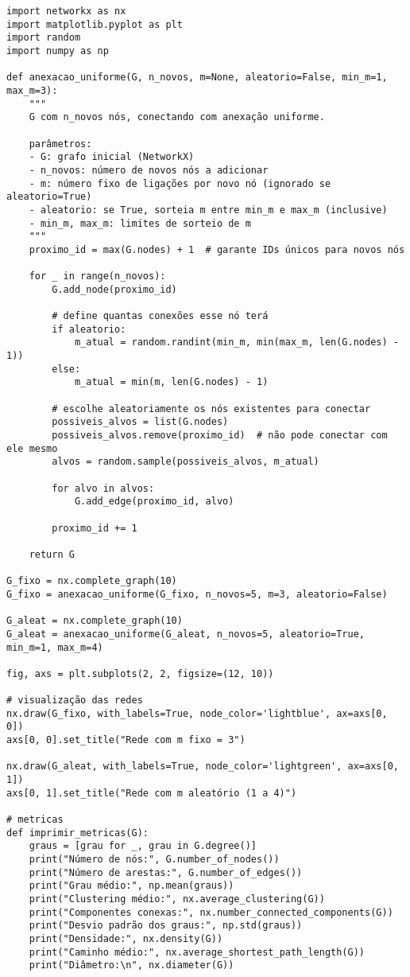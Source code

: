 \documentclass{article}
\begin{document}
\begin{verbatim}
import networkx as nx
import matplotlib.pyplot as plt
import random
import numpy as np

def anexacao_uniforme(G, n_novos, m=None, aleatorio=False, min_m=1, max_m=3):
    """
    G com n_novos nós, conectando com anexação uniforme.

    parâmetros:
    - G: grafo inicial (NetworkX)
    - n_novos: número de novos nós a adicionar
    - m: número fixo de ligações por novo nó (ignorado se aleatorio=True)
    - aleatorio: se True, sorteia m entre min_m e max_m (inclusive)
    - min_m, max_m: limites de sorteio de m
    """
    proximo_id = max(G.nodes) + 1  # garante IDs únicos para novos nós

    for _ in range(n_novos):
        G.add_node(proximo_id)

        # define quantas conexões esse nó terá
        if aleatorio:
            m_atual = random.randint(min_m, min(max_m, len(G.nodes) - 1))
        else:
            m_atual = min(m, len(G.nodes) - 1)

        # escolhe aleatoriamente os nós existentes para conectar
        possiveis_alvos = list(G.nodes)
        possiveis_alvos.remove(proximo_id)  # não pode conectar com ele mesmo
        alvos = random.sample(possiveis_alvos, m_atual)

        for alvo in alvos:
            G.add_edge(proximo_id, alvo)

        proximo_id += 1

    return G

G_fixo = nx.complete_graph(10)
G_fixo = anexacao_uniforme(G_fixo, n_novos=5, m=3, aleatorio=False)

G_aleat = nx.complete_graph(10)
G_aleat = anexacao_uniforme(G_aleat, n_novos=5, aleatorio=True, min_m=1, max_m=4)

fig, axs = plt.subplots(2, 2, figsize=(12, 10))

# visualização das redes
nx.draw(G_fixo, with_labels=True, node_color='lightblue', ax=axs[0, 0])
axs[0, 0].set_title("Rede com m fixo = 3")

nx.draw(G_aleat, with_labels=True, node_color='lightgreen', ax=axs[0, 1])
axs[0, 1].set_title("Rede com m aleatório (1 a 4)")

# metricas
def imprimir_metricas(G):
    graus = [grau for _, grau in G.degree()]
    print("Número de nós:", G.number_of_nodes())
    print("Número de arestas:", G.number_of_edges())
    print("Grau médio:", np.mean(graus))
    print("Clustering médio:", nx.average_clustering(G))
    print("Componentes conexas:", nx.number_connected_components(G))
    print("Desvio padrão dos graus:", np.std(graus))
    print("Densidade:", nx.density(G))
    print("Caminho médio:", nx.average_shortest_path_length(G))
    print("Diâmetro:\n", nx.diameter(G))



\end{verbatim}
\end{document}
